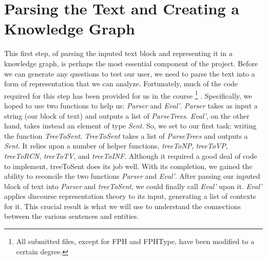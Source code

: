 \documentclass[finalcopy]{srpaper}
\begin{document}


%
%
\chapter{Parsing the Text and Creating a Knowledge Graph}
\label{Chapter:Parsing/Knowledge Grap}
 
This first step, of parsing the inputed text block and representing it in a knowledge graph, is perhaps the most essential component of the project. Before we can generate any questions to test our user, we need to parse the text into a form of representation that we can analyze.
\newline
Fortunately, much of the code required for this step has been provided for us in the course 
\footnote{All submitted files, except for FPH and FPH\textunderscore Type, have been modified to a certain degree.}
. Specifically, we hoped to use two functions to help us: \textit{Parser} and \textit{Eval'}. \textit{Parser} takes as input a string (our block of text) and outputs a list of \textit{ParseTrees}. \textit{Eval'}, on the other hand, takes instead an element of type \textit{Sent}. So, we set to our first task: writing the function \textit{TreeToSent}.
\newline
\textit{TreeToSent} takes a list of \textit{ParseTrees} and outputs a \textit{Sent}. It relies upon a number of helper functions, \textit{treeToNP}, \textit{treeToVP}, \textit{treeToRCN}, \textit{treeToTV}, and \textit{treeToINF}. Although it required a good deal of code to implement, treeToSent does its job well. With its completion, we gained the ability to reconcile the two functions \textit{Parser} and \textit{Eval'}. After passing our inputed block of text into \textit{Parser} and \textit{treeToSent}, we could finally call \textit{Eval'} upon it. \textit{Eval'} applies discourse representation theory to its input, generating a list of contexts for it. This crucial result is what we will use to understand the connections between the various sentences and entities.


\end{document}
